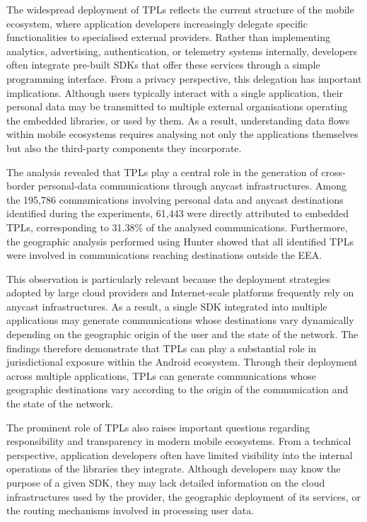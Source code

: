 The widespread deployment of TPLs reflects the current structure of the mobile ecosystem, where application developers increasingly delegate specific functionalities to specialised external providers. Rather than implementing analytics, advertising, authentication, or telemetry systems internally, developers often integrate pre-built SDKs that offer these services through a simple programming interface. From a privacy perspective, this delegation has important implications. Although users typically interact with a single application, their personal data may be transmitted to multiple external organisations operating the embedded libraries, or used by them. As a result, understanding data flows within mobile ecosystems requires analysing not only the applications themselves but also the third-party components they incorporate.

The analysis revealed that TPLs play a central role in the generation of cross-border personal-data communications through anycast infrastructures. Among the 195,786 communications involving personal data and anycast destinations identified during the experiments, 61,443 were directly attributed to embedded TPLs, corresponding to 31.38\% of the analysed communications. Furthermore, the geographic analysis performed using Hunter showed that all identified TPLs were involved in communications reaching destinations outside the EEA.

This observation is particularly relevant because the deployment strategies adopted by large cloud providers and Internet-scale platforms frequently rely on anycast infrastructures. As a result, a single SDK integrated into multiple applications may generate communications whose destinations vary dynamically depending on the geographic origin of the user and the state of the network. The findings therefore demonstrate that TPLs can play a substantial role in jurisdictional exposure within the Android ecosystem. Through their deployment across multiple applications, TPLs can generate communications whose geographic destinations vary according to the origin of the communication and the state of the network.

The prominent role of TPLs also raises important questions regarding responsibility and transparency in modern mobile ecosystems. From a technical perspective, application developers often have limited visibility into the internal operations of the libraries they integrate. Although developers may know the purpose of a given SDK, they may lack detailed information on the cloud infrastructures used by the provider, the geographic deployment of its services, or the routing mechanisms involved in processing user data.

